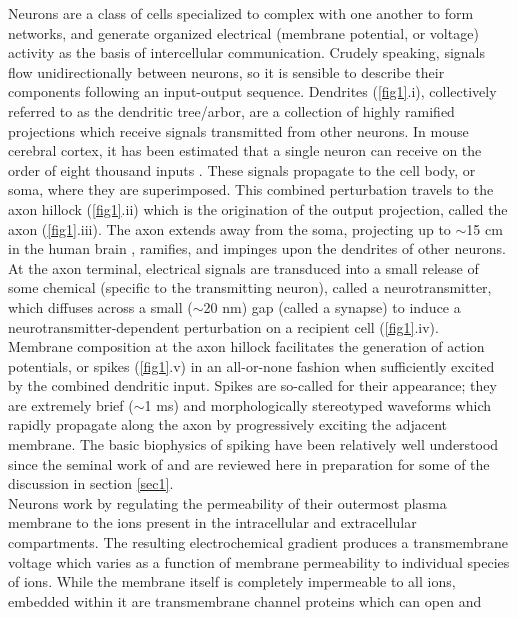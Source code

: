 \documentclass[12pt, oneside]{report}
\newcommand{\1}[1]{\mathbbm{1}_{\{#1\}}}
\theoremstyle{definition}
\begin{document}
\indent Neurons are a class of cells specialized to complex with one another to
form networks, and generate organized electrical (membrane potential, or
voltage) activity as the basis of intercellular communication. Crudely speaking,
signals flow unidirectionally between neurons, so it is sensible to describe
their components following an input-output sequence. Dendrites (\ref{fig1}.i),
collectively referred to as the dendritic tree/arbor, are a collection of highly
ramified projections which receive signals transmitted from other neurons. In
mouse cerebral cortex, it has been estimated that a single neuron can receive on the order
of eight thousand inputs \cite{Schüz_Palm_1989}. These signals propagate to the
cell body, or soma, where they are superimposed. This combined perturbation
travels to the axon hillock (\ref{fig1}.ii) which is the origination of the
output projection, called the axon (\ref{fig1}.iii). The axon extends away from
the soma, projecting up to $\sim$15 cm in the human brain
\cite{Liewald_Miller_Logothetis_Wagner_Schüz_2014}, ramifies, and impinges upon
the dendrites of other neurons. At the axon terminal, electrical signals are
transduced into a small release of some chemical (specific to the transmitting
neuron), called a neurotransmitter, which diffuses across a small ($\sim$20 nm)
gap (called a synapse) to induce a neurotransmitter-dependent perturbation on
a recipient cell (\ref{fig1}.iv).\\[5pt]
\indent Membrane composition at the axon hillock facilitates the generation of
action potentials, or spikes (\ref{fig1}.v) in an all-or-none fashion when
sufficiently excited by the combined dendritic input. Spikes are so-called for
their appearance; they are extremely brief ($\sim$1 ms) and morphologically
stereotyped waveforms which rapidly propagate along the axon by progressively
exciting the adjacent membrane. The basic biophysics of spiking have been
relatively well understood since the seminal work of \cite{Hodgkin_Huxley_1952}
and are reviewed here in preparation for some of the discussion in section
\ref{sec1}.\\[5pt]
\indent Neurons work by regulating the permeability of their outermost plasma
membrane to the ions present in the intracellular and extracellular
compartments. The resulting electrochemical gradient produces a transmembrane
voltage which varies as a function of membrane permeability to individual
species of ions. While the membrane itself is completely impermeable to all
ions, embedded within it are transmembrane channel proteins which can open and
\end{document}
